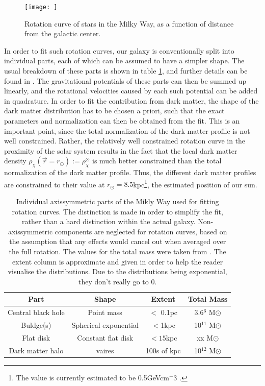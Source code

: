 \begin{figure}[h]
    \centering
    \texttt{[image: ]}
    \caption{Rotation curve of stars in the Milky Way, as a function of distance from the galactic center.}
    \label{fig:MilkyWayRotationCurve}
\end{figure}

In order to fit such rotation curves, our galaxy is conventionally split into individual parts, each of which can be assumed to have a simpler shape. The usual breakdown of these parts is shown in table \ref{tab:MilkyWayBreakdown}, and further details can be found in \cite{Sofue_2016}. The gravitational potentials of these parts can then be summed up linearly, and the rotational velocities caused by each such potential can be added in quadrature. In order to fit the contribution from dark matter, the shape of the dark matter distribution has to be chosen a priori, such that the exact parameters and normalization can then be obtained from the fit. This is an important point, since the total normalization of the dark matter profile is not well constrained. Rather, the relatively well constrained rotation curve in the proximity of the solar system results in the fact that the local dark matter density $\rho_\chi(\vec{r}=r_\odot) := \rho_\chi^\odot$ is much better constrained than the total normalization of the dark matter profile. Thus, the different dark matter profiles are constrained to their value at $r_\odot = 8.5$kpc\footnote{The value is currently estimated to be 0.5GeVcm$^-3$ \cite{}.}, the estimated position of our sun. \\
\begin{table}[h]
    \centering
    \begin{tabular}{|c|c|c|c|}
        \hline
        Part & Shape & Extent & Total Mass \\
        \hline
        Central black hole & Point mass & $<$ 0.1pc & 3.6\times 10$^6$ M$\odot$ \\
        \hline
        Buldge(s) & Spherical exponential & $<$1kpc & 10$^11$ M$\odot$ \\
        \hline
        Flat disk & Constant flat disk & $<15$kpc & xx M$\odot$ \\
        \hline
        Dark matter halo & vaires & 100s of kpc & 10$^12$ M$\odot$ \\
        \hline
    \end{tabular}
    \label{tab:MilkyWayBreakdown}
    \caption{Individual axissymmetric parts of the Mikly Way used for fitting rotation curves. The distinction is made in order to simplify the fit, rather than a hard distinction within the actual galaxy. Non-axissymmetric components are neglected for rotation curves, based on the assumption that any effects would cancel out when averaged over the full rotation. The values for the total mass were taken from \cite{Sofue_2016}. The extent column is approximate and given in order to help the reader visualise the distributions. Due to the distributions being exponential, they don't really go to 0.}

\end{table}

